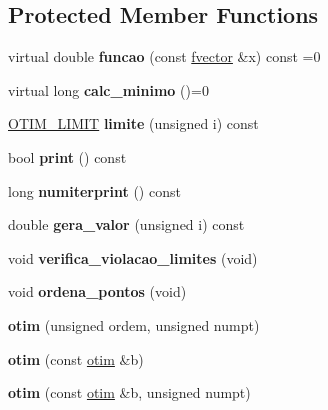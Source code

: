 \subsection*{Protected Member Functions}
\begin{DoxyCompactItemize}
\item 
virtual double {\bfseries funcao} (const \hyperlink{classfvector}{fvector} \&x) const =0\hypertarget{classotim_a79bf8030ad589bc7545bcb39d975150a}{}\label{classotim_a79bf8030ad589bc7545bcb39d975150a}

\item 
virtual long {\bfseries calc\+\_\+minimo} ()=0\hypertarget{classotim_aef115c9b2741a1a2bce844b6af78cf52}{}\label{classotim_aef115c9b2741a1a2bce844b6af78cf52}

\item 
\hyperlink{structOTIM__LIMIT}{O\+T\+I\+M\+\_\+\+L\+I\+M\+IT} {\bfseries limite} (unsigned i) const \hypertarget{classotim_a6206da9af33ac79156b278ec35500816}{}\label{classotim_a6206da9af33ac79156b278ec35500816}

\item 
bool {\bfseries print} () const \hypertarget{classotim_a06249c5cda3860c57cb800d9b5b23b37}{}\label{classotim_a06249c5cda3860c57cb800d9b5b23b37}

\item 
long {\bfseries numiterprint} () const \hypertarget{classotim_ab334c1a6332c4bad46070e5243e4387f}{}\label{classotim_ab334c1a6332c4bad46070e5243e4387f}

\item 
double {\bfseries gera\+\_\+valor} (unsigned i) const \hypertarget{classotim_a79802e49862b9d5c23f19cbc33488ec0}{}\label{classotim_a79802e49862b9d5c23f19cbc33488ec0}

\item 
void {\bfseries verifica\+\_\+violacao\+\_\+limites} (void)\hypertarget{classotim_acae778dafc7cb0e7ef0406a68f94edc2}{}\label{classotim_acae778dafc7cb0e7ef0406a68f94edc2}

\item 
void {\bfseries ordena\+\_\+pontos} (void)\hypertarget{classotim_a2e6d9904f89b0b75e20a9c6bf18c430a}{}\label{classotim_a2e6d9904f89b0b75e20a9c6bf18c430a}

\item 
{\bfseries otim} (unsigned ordem, unsigned numpt)\hypertarget{classotim_a55c18c1fa1fb543483e7b8ef6abba226}{}\label{classotim_a55c18c1fa1fb543483e7b8ef6abba226}

\item 
{\bfseries otim} (const \hyperlink{classotim}{otim} \&b)\hypertarget{classotim_ad46d56749dc4baf07acf684a19168696}{}\label{classotim_ad46d56749dc4baf07acf684a19168696}

\item 
{\bfseries otim} (const \hyperlink{classotim}{otim} \&b, unsigned numpt)\hypertarget{classotim_a40d4193e3e00c234b47995d5e5170354}{}\label{classotim_a40d4193e3e00c234b47995d5e5170354}

\end{DoxyCompactItemize}
